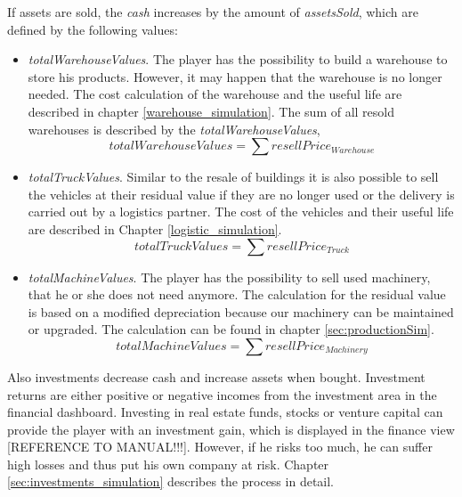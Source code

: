 If assets are sold, the \textit{cash} increases by the amount of \textit{assetsSold}, which are defined by the following values:
   
\begin{itemize}
    \item \textit{totalWarehouseValues}. The player has the possibility to build a warehouse to store his products. However, it may happen that the warehouse is no longer needed. %
    The cost calculation of the warehouse and the useful life are described in chapter \ref{warehouse_simulation}. The sum of all resold warehouses is described by the \textit{totalWarehouseValues}, 
    \begin{equation}
        totalWarehouseValues = \sum resellPrice_{Warehouse}
    \end{equation}
    \item \textit{totalTruckValues}. Similar to the resale of buildings it is also possible to sell the vehicles at their residual value if they are no longer used or the delivery is carried out by a logistics partner. The cost of the vehicles and their useful life are described in Chapter \ref{logistic_simulation}. %
    \begin{equation}
        totalTruckValues = \sum resellPrice_{Truck}
    \end{equation}
    \item \textit{totalMachineValues}. The player has the possibility to sell used machinery, that he or she does not need anymore. The calculation for the residual value is based on a modified depreciation because our machinery can be maintained or upgraded. The calculation can be found in chapter \ref{sec:productionSim}. %
    \begin{equation}
        totalMachineValues = \sum resellPrice_{Machinery}
    \end{equation}
\end{itemize}

Also investments decrease cash and increase assets when bought. Investment returns are either positive or negative incomes from the investment area in the financial dashboard. Investing in real estate funds, stocks or venture capital can provide the player with an investment gain, which is displayed in the finance view %
[REFERENCE TO MANUAL!!!]. However, if he risks too much, he can suffer high losses and thus put his own company at risk. Chapter \ref{sec:investments_simulation} describes the process in detail.

